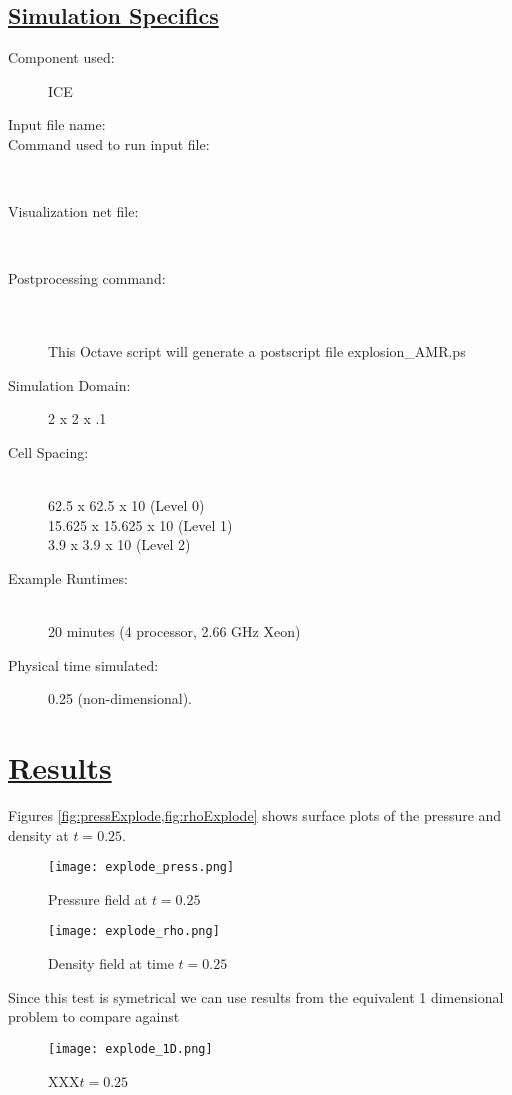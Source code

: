 \subsection*{\underline{Simulation Specifics}}
\begin{description} 
\item [Component used:] \hfill ICE
\item [Input file name:] \hfill {}
\item [Command used to run input file:]\hfill \\
\item [Visualization net file:]\hfill {}\\
\item [Postprocessing command:]\hfill \\
\\
This Octave script will generate a postscript file explosion\_AMR.ps


\item [Simulation Domain:]\hfill    2 x 2 x .1
\item [Cell Spacing:]\hfill \\ 
62.5    x 62.5    x 10 (Level 0)\\
15.625  x 15.625  x 10 (Level 1)\\
3.9     x 3.9     x 10 (Level 2)

\item [Example Runtimes:] \hfill \\
 20 minutes   (4 processor, 2.66 GHz Xeon)

\item [Physical time simulated:] \hfill 0.25 (non-dimensional).

\end{description}

\section*{\underline{Results}}
Figures \ref{fig:pressExplode,fig:rhoExplode} shows surface plots of the pressure and density at $t=0.25.$  
\newpage
\begin{figure}
 \texttt{[image: explode\_press.png]}
\caption{Pressure field at $t=0.25$}
\label{fig:pressExplode}
\end{figure}
%
\newpage
\begin{figure}
  \texttt{[image: explode\_rho.png]}
  \caption{Density field at time $t=0.25$}
  \label{fig:rhoExplode}
\end{figure}
\newpage
%
Since this test is symetrical we can use results from the equivalent 1 dimensional problem to compare against
%
\begin{figure}
  \texttt{[image: explode\_1D.png]}
  \caption{XXX$t=0.25$}
  \label{fig:1dExplode}
\end{figure}
\newpage

